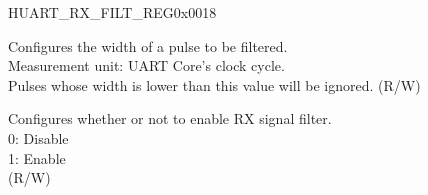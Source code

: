 \begin{register}{H}{UART\_RX\_FILT\_REG}{0x0018}\label{regdesc:UARTRXFILTREG}
%
%
%
\regnewline%
\begin{regdesc}\begin{reglist}
\label{fielddesc:UARTGLITCHFILT}\item [UART\_GLITCH\_FILT] Configures the width of a pulse to be filtered.\\Measurement unit: UART Core's clock cycle.\\Pulses whose width is lower than this value will be ignored. (R/W)
\label{fielddesc:UARTGLITCHFILTEN}\item [UART\_GLITCH\_FILT\_EN] Configures whether or not to enable RX signal filter.\\
0: Disable\\
1: Enable\\(R/W)
\end{reglist}\end{regdesc}
\end{register}


